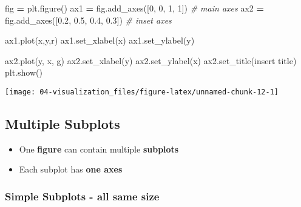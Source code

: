 \documentclass[
]{book}
\newenvironment{Shaded}{\begin{snugshade}}{\end{snugshade}}
\newcommand{\CommentTok}[1]{\textcolor[rgb]{0.37,0.37,0.37}{\textit{#1}}}
\newcommand{\DecValTok}[1]{\textcolor[rgb]{0.06,0.06,0.06}{#1}}
\newcommand{\FloatTok}[1]{\textcolor[rgb]{0.06,0.06,0.06}{#1}}
\newcommand{\NormalTok}[1]{#1}
\newcommand{\OperatorTok}[1]{\textcolor[rgb]{0.43,0.43,0.43}{\textbf{#1}}}
\newcommand{\StringTok}[1]{\textcolor[rgb]{0.5,0.5,0.5}{#1}}
\providecommand{\tightlist}{%
  \setlength{\itemsep}{0pt}\setlength{\parskip}{0pt}}
\begin{document}
\begin{Shaded}
\begin{Highlighting}[]
\NormalTok{fig }\OperatorTok{=}\NormalTok{ plt.figure()}
\NormalTok{ax1 }\OperatorTok{=}\NormalTok{ fig.add\_axes([}\DecValTok{0}\NormalTok{, }\DecValTok{0}\NormalTok{, }\DecValTok{1}\NormalTok{, }\DecValTok{1}\NormalTok{])         }\CommentTok{\# main axes}
\NormalTok{ax2 }\OperatorTok{=}\NormalTok{ fig.add\_axes([}\FloatTok{0.2}\NormalTok{, }\FloatTok{0.5}\NormalTok{, }\FloatTok{0.4}\NormalTok{, }\FloatTok{0.3}\NormalTok{]) }\CommentTok{\# inset axes}

\NormalTok{ax1.plot(x,y,}\StringTok{\textquotesingle{}r\textquotesingle{}}\NormalTok{)}
\NormalTok{ax1.set\_xlabel(}\StringTok{\textquotesingle{}x\textquotesingle{}}\NormalTok{)}
\NormalTok{ax1.set\_ylabel(}\StringTok{\textquotesingle{}y\textquotesingle{}}\NormalTok{)}

\NormalTok{ax2.plot(y, x, }\StringTok{\textquotesingle{}g\textquotesingle{}}\NormalTok{)}
\NormalTok{ax2.set\_xlabel(}\StringTok{\textquotesingle{}y\textquotesingle{}}\NormalTok{)}
\NormalTok{ax2.set\_ylabel(}\StringTok{\textquotesingle{}x\textquotesingle{}}\NormalTok{)}
\NormalTok{ax2.set\_title(}\StringTok{\textquotesingle{}insert title\textquotesingle{}}\NormalTok{)}
\NormalTok{plt.show()}
\end{Highlighting}
\end{Shaded}

\texttt{[image: 04-visualization\_files/figure-latex/unnamed-chunk-12-1]}

\hypertarget{multiple-subplots-1}{%
\subsection{Multiple Subplots}\label{multiple-subplots-1}}

\begin{itemize}
\tightlist
\item
  One \textbf{figure} can contain multiple \textbf{subplots}\\
\item
  Each subplot has \textbf{one axes}
\end{itemize}

\hypertarget{simple-subplots---all-same-size}{%
\subsubsection{Simple Subplots - all same size}\label{simple-subplots---all-same-size}}
\end{document}
